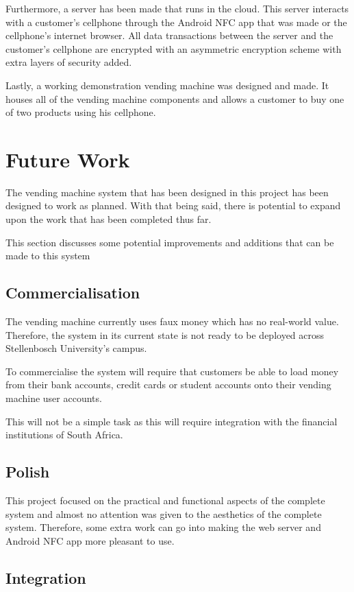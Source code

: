 Furthermore, a server has been made that runs in the cloud. This server interacts with a
customer's cellphone through the Android NFC app that was made or the cellphone's
internet browser. All data transactions between the server and the customer's cellphone
are encrypted with an asymmetric encryption scheme with extra layers of security added.

Lastly, a working demonstration vending machine was designed and made. It houses all of
the vending machine components and allows a customer to buy one of two products using
his cellphone. 

\section{Future Work}

The vending machine system that has been designed in this project has been designed to
work as planned. With that being said, there is potential to expand upon the work that has
been completed thus far.

This section discusses some potential improvements and additions that can be made to this
system

\subsection{Commercialisation}

The vending machine currently uses faux money which has no real-world value. Therefore,
the system in its current state is not ready to be deployed across Stellenbosch
University's campus. 

To commercialise the system will require that customers be able to load money
from their bank accounts, credit cards or student accounts onto their vending machine user
accounts. 

This will not be a simple task as this will require integration with the financial
institutions of South Africa. 

\subsection{Polish}

This project focused on the practical and functional aspects of the complete system and
almost no attention was given to the aesthetics of the complete system. Therefore, some
extra work can go into making the web server and Android NFC app more pleasant to use. 

\subsection{Integration}

